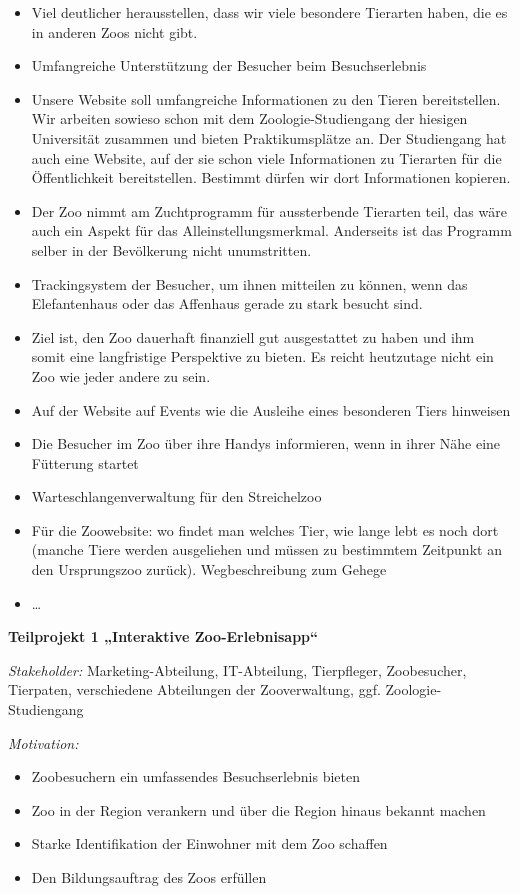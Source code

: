 \begin{itemize}[
	label={},
	leftmargin=12mm,
	]
	\item Viel deutlicher herausstellen, dass wir viele besondere Tierarten haben, die es in anderen Zoos nicht gibt.
	\item Umfangreiche Unterstützung der Besucher beim Besuchserlebnis
	\item Unsere Website soll umfangreiche Informationen zu den Tieren bereitstellen. Wir arbeiten sowieso schon mit dem Zoologie-Studiengang der hiesigen Universität zusammen und bieten Praktikumsplätze an. Der Studiengang hat auch eine Website, auf der sie schon viele Informationen zu Tierarten für die Öffentlichkeit bereitstellen. Bestimmt dürfen wir dort Informationen kopieren.
	\item Der Zoo nimmt am Zuchtprogramm für aussterbende Tierarten teil, das wäre auch ein Aspekt für das Alleinstellungsmerkmal. Anderseits ist das Programm selber in der Bevölkerung nicht unumstritten.
	\item Trackingsystem der Besucher, um ihnen mitteilen zu können, wenn das Elefantenhaus oder das Affenhaus gerade zu stark besucht sind.
	\item Ziel ist, den Zoo dauerhaft finanziell gut ausgestattet zu haben und ihm somit eine langfristige Perspektive zu bieten. Es reicht heutzutage nicht ein Zoo wie jeder andere zu sein.
	\item Auf der Website auf Events wie die Ausleihe eines besonderen Tiers hinweisen
	\item Die Besucher im Zoo über ihre Handys informieren, wenn in ihrer Nähe eine Fütterung startet
	\item Warteschlangenverwaltung für den Streichelzoo
	\item Für die Zoowebsite: wo findet man welches Tier, wie lange lebt es noch dort (manche Tiere werden ausgeliehen und müssen zu bestimmtem Zeitpunkt an den Ursprungszoo zurück). Wegbeschreibung zum Gehege 
	\item \ldots
\end{itemize}


\textbf{Teilprojekt 1 „Interaktive Zoo-Erlebnisapp“}

\textit{Stakeholder:} Marketing-Abteilung, IT-Abteilung, Tierpfleger, Zoobesucher, Tierpaten, verschiedene Abteilungen der Zooverwaltung, ggf. Zoologie-Studiengang

\textit{Motivation:}
\begin{itemize}
	\item Zoobesuchern ein umfassendes Besuchserlebnis bieten
	\item Zoo in der Region verankern und über die Region hinaus bekannt machen
	\item Starke Identifikation der Einwohner mit dem Zoo schaffen
	\item Den Bildungsauftrag des Zoos erfüllen
\end{itemize}

